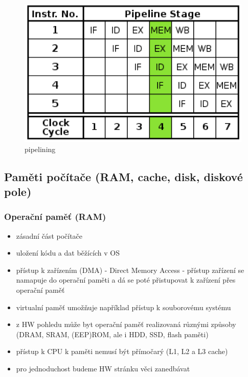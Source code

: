 \documentclass[10pt,a4paper]{article}
\begin{document}
\begin{figure} [h]
		\includegraphics[scale=0.7]{img/pipelining.png}
		\caption{pipelining}	
\end{figure}



\subsection{Paměti počítače (RAM, cache, disk, diskové pole)}

\subsubsection{Operační paměť (RAM)}
\begin{itemize}
	\item zásadní část počítače
	\item uložení kódu a dat běžících v OS
	\item přístup k zařízením (DMA) - Direct Memory Access - přístup zařízení se namapuje do
operační paměti a dá se poté přistupovat k zařízení přes operační paměť
	\item virtualní paměť umožňuje například přístup k souborovému systému
	\item z HW pohledu může byt operační paměť realizovaná různými způsoby (DRAM, SRAM,
(EEP)ROM, ale i HDD, SSD, flash paměti)
	\item přístup k CPU k paměti nemusí být přímočarý (L1, L2 a L3 cache)
	\item pro jednoduchost budeme HW stránku věci zanedbávat
\end{itemize}
\end{document}
